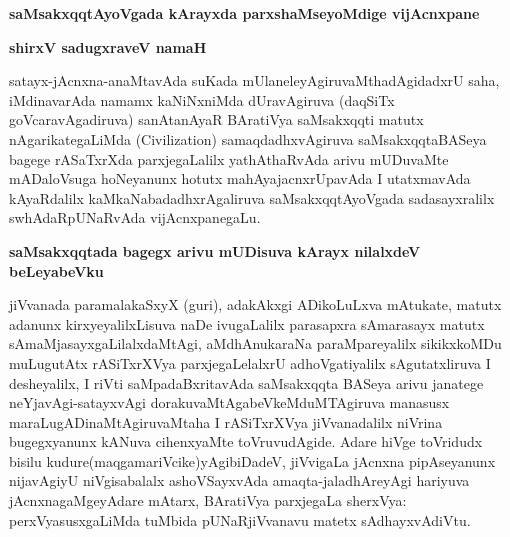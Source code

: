 
{\medskip
\noindent
{\large\bf saMsakxqqtAyoVgada kArayxda parxshaMseyoMdige vijAcnxpane}}\label{page21}

\bigskip

{\centerline{\large\bf{shirxV sadugxraveV namaH}}}

\medskip

satayx-jAcnxna-anaMtavAda suKada mUlaneleyAgiruvaMthadAgidadxrU saha, iMdinavarAda\- namamx kaNiNx\-niMda dUravAgiruva (daqSiTx goVcaravAgadiruva) sanA\-tanAyaR BAratiVya saMsakxqqti matutx nAgari\-kategaLiMda {\rm (Civilization)} samaqdadhx\-vAgiruva saMsakxqqtaBASeya bagege rASaTxrXda parxjegaLalilx yathAthaR\-vAda arivu mUDuvaMte mADaloVsuga hoNeyanunx hotutx mahAyajacnxrUpavAda I utatxma\-vAda kAyaRdalilx kaMkaNabadadhxrAgaliruva saMsakxqqtAyoVgada sadasayxralilx swhAdaRpUNaRvAda vijAcnx\-pane\-gaLu.

{\medskip
\noindent
{\large\bf saMsakxqqtada bagegx arivu mUDisuva kArayx nilalxdeV beLeyabeVku}}\label{page21a}
\medskip

\noindent
jiVvanada paramalakaSxyX (guri), adakAkxgi ADikoLuLxva mAtukate, matutx adanunx kirxyeyalilxLisuva naDe ivugaLalilx parasapxra sAmarasayx matutx sAmaMjasayxgaLilalxdaMtAgi, aMdhAnukaraNa paraMpareyalilx sikikx\-koMDu muLugutAtx rASiTxrXVya parxjegaLelalxrU adhoVgatiyalilx sAgutatxliruva I desheyalilx, I riVti saMpadaBx\-ritavAda saMsakxqqta BASeya arivu janatege neYjavAgi-satayxvAgi dorakuvaMtAgabeVkeMduMTAgiruva manasusx maraLugADinaMtAgiruvaMtaha I rASiTxrXVya jiVvanadalilx niVrina bugegx\break\-yanunx kANuva cihenx\-yaMte toVruvudAgide. Adare hiVge toVridudx bisilu kudure(maqgamariVcike)yAgibiDadeV, jiVvi\-gaLa jAcnxna pipAseyanunx nija\break\-vAgiyU niVgisabalalx ashoVSayxvAda amaqta-jaladhAreyAgi hari\-yuva jAcnxna\-gaMgeyAdare mAtarx, BAratiVya parxjegaLa sherxVya: perxVyasusxgaLiMda tuMbida pUNaR\-jiVva\-navu matetx sAdhayxvAdiVtu.

